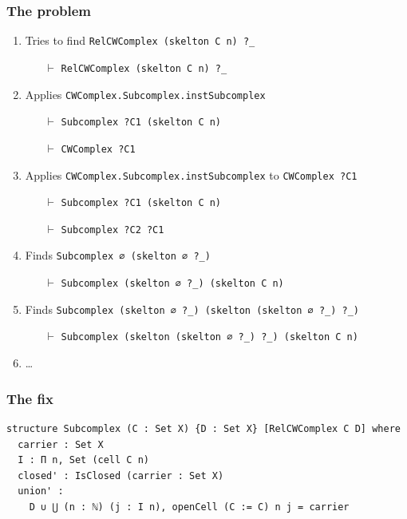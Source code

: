 \documentclass{beamer}
\newcommand{\myinline}[1]{\lstinline[basicstyle={\ttfamily\footnotesize}]|#1|}
\begin{document}
\begin{frame}
\frametitle{The problem}
\footnotesize
\begin{enumerate}
  \item[\textbullet] Tries to find \myinline{RelCWComplex (skelton C n) ?_}
  \begin{enumerate}
    \item[$\vdash$] \myinline{RelCWComplex (skelton C n) ?_}
  \end{enumerate}
  \item[\textcolor{Green}{\textbullet}] Applies \myinline{CWComplex.Subcomplex.instSubcomplex}
  \begin{enumerate}
    \item[$\vdash$] \myinline{Subcomplex ?C1 (skelton C n)}
    \item[$\vdash$] \myinline{CWComplex ?C1}
  \end{enumerate}
  \item[\textcolor{Green}{\textbullet}] Applies \myinline{CWComplex.Subcomplex.instSubcomplex} to \myinline{CWComplex ?C1}
  \begin{enumerate}
    \item[$\vdash$] \myinline{Subcomplex ?C1 (skelton C n)}
    \item[$\vdash$] \myinline{Subcomplex ?C2 ?C1}
  \end{enumerate}
  \item[\textcolor{Red}{\textbullet}] Finds \myinline{Subcomplex ∅ (skelton ∅ ?_)}
  \begin{enumerate}
    \item[$\vdash$] \myinline{Subcomplex (skelton ∅ ?_) (skelton C n)}
  \end{enumerate}
  \item[\textcolor{Red}{\textbullet}] Finds \myinline{Subcomplex (skelton ∅ ?_) (skelton (skelton ∅ ?_) ?_)}
  \begin{enumerate}
    \item[$\vdash$] \myinline{Subcomplex (skelton (skelton ∅ ?_) ?_) (skelton C n)}
  \end{enumerate}
  \item[\textcolor{Red}{\textbullet}] \dots
\end{enumerate}
\end{frame}

\begin{frame}[fragile]
\frametitle{The fix}
\begin{lstlisting}[basicstyle=\ttfamily\footnotesize]
structure Subcomplex (C : Set X) {D : Set X} [RelCWComplex C D] where
  carrier : Set X
  I : Π n, Set (cell C n)
  closed' : IsClosed (carrier : Set X)
  union' : 
    D ∪ ⋃ (n : ℕ) (j : I n), openCell (C := C) n j = carrier
\end{lstlisting}
\end{frame}
\end{document}
